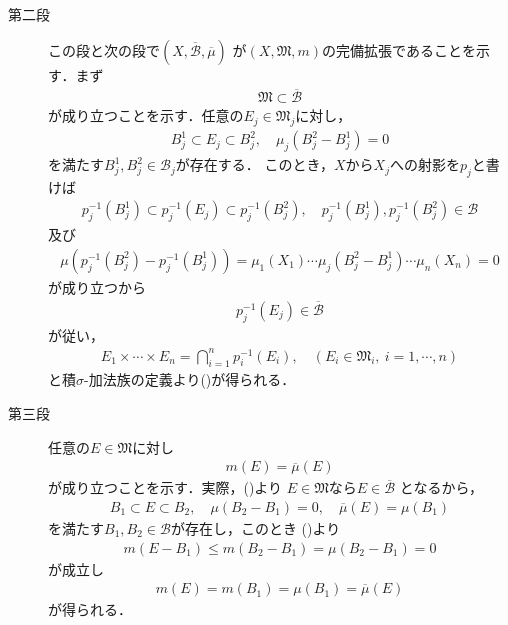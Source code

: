 \begin{prf}
\begin{description}
				\item[第二段]
					この段と次の段で$\left(X, \overline{\mathcal{B}}, \overline{\mu} \right)$
					が$\left( X, \mathfrak{M}, m \right)$の完備拡張であることを示す．まず
					\begin{align}
						\mathfrak{M}
						\subset \overline{\mathcal{B}}
						\label{eq:thm_product_space_of_complete_measure_space_2}
					\end{align}
					が成り立つことを示す．任意の$E_j \in \mathfrak{M}_j$に対し，
					\begin{align}
						B^1_j \subset E_j \subset B^2_j,
						\quad \mu_j\left( B^2_j - B^1_j \right) = 0
					\end{align}
					を満たす$B^1_j,B^2_j \in \mathcal{B}_j$が存在する．
					このとき，$X$から$X_j$への射影を$p_j$と書けば
					\begin{align}
						p_j^{-1}\left(B^1_j\right) \subset p_j^{-1}(E_j) \subset p_j^{-1}\left(B^2_j\right),
						\quad p_j^{-1}\left(B^1_j\right),p_j^{-1}\left(B^2_j\right) \in \mathcal{B}
					\end{align}
					及び
					\begin{align}
						\mu\left(p_j^{-1}\left(B^2_j\right)-p_j^{-1}\left(B^1_j\right)\right)
						= \mu_1(X_1) \cdots \mu_j\left(B^2_j - B^1_j\right) \cdots \mu_n(X_n)
						= 0
					\end{align}
					が成り立つから
					\begin{align}
						p_j^{-1}(E_j) \in \overline{\mathcal{B}}
					\end{align}
					が従い，
					\begin{align}
						E_1 \times \cdots \times E_n
						= \bigcap_{i=1}^n p_i^{-1}(E_i),
						\quad (E_i \in \mathfrak{M}_i,\ i=1,\cdots,n)
					\end{align}
					と積$\sigma$-加法族の定義より()が得られる．
				
				\item[第三段]
					任意の$E \in \mathfrak{M}$に対し
					\begin{align}
						m(E)
						= \overline{\mu}(E)
					\end{align}
					が成り立つことを示す．実際，()より
					$E \in \mathfrak{M}$なら$E \in \overline{\mathcal{B}}$
					となるから，
					\begin{align}
						B_1 \subset E \subset B_2,
						\quad \mu(B_2-B_1) = 0,
						\quad \overline{\mu}(E)
						= \mu(B_1)
						\label{eq:thm_product_space_of_complete_measure_space_3}
					\end{align}
					を満たす$B_1,B_2 \in \mathcal{B}$が存在し，このとき
					()より
					\begin{align}
						m(E-B_1)
						\leq m(B_2-B_1)
						= \mu(B_2-B_1)
						= 0
					\end{align}
					が成立し
					\begin{align}
						m(E)
						= m(B_1)
						= \mu(B_1)
						= \overline{\mu}(E)
					\end{align}
					が得られる．
					

\end{description}
\end{prf}
